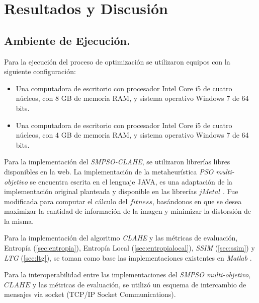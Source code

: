 \chapter{Resultados y Discusión}
\label{resultadosdiscusion}
\ifpdf
  \graphicspath{{Chapter6/Chapter6Figs/PNG/}{Chapter6/Chapter6Figs/PDF/}{Chapter6/Chapter6Figs/}}
\else
  \graphicspath{{Chapter6/Chapter6Figs/EPS/}{Chapter6/Chapter6Figs/}}
\fi


\section{Ambiente de Ejecución.}

Para la ejecución del proceso de optimización se utilizaron equipos con la siguiente configuración:
\begin{itemize}
\item Una computadora de escritorio con procesador Intel Core i5 de cuatro núcleos, con 8 GB de memoria RAM, y sistema operativo Windows 7 de 64 bits.
\item Una computadora de escritorio con procesador Intel Core i5 de cuatro núcleos, con 4 GB de memoria RAM, y sistema operativo Windows 7 de 64 bits.
\end{itemize}

Para la implementación del \textit{SMPSO-CLAHE}, se utilizaron librerías libres disponibles en la web. La implementación de la metaheurística \textit{PSO multi-objetivo} se encuentra escrita en el lenguaje JAVA, es una adaptación de la implementación original planteada y disponible en las librerías $jMetal$ \cite{Durillo2011}. Fue modificada para computar el cálculo del $fitness$, basándonos en que se desea maximizar la cantidad de información de la imagen y minimizar la distorsión de la misma.

Para la implementación del algoritmo \textit{CLAHE} y las métricas de evaluación, Entropía (\ref{sec:entropia}), Entropía Local (\ref{sec:entropialocal}), \textit{SSIM} (\ref{sec:ssim}) y \textit{LTG} (\ref{sec:ltg}), se toman como base las implementaciones existentes en \textit{Matlab} \cite{MatlabOTB}. 

Para la interoperabilidad entre las implementaciones del \textit{SMPSO multi-objetivo}, $CLAHE$ y las métricas de evaluación, se utilizó un esquema de intercambio de mensajes via socket (TCP/IP Socket Communications). 

